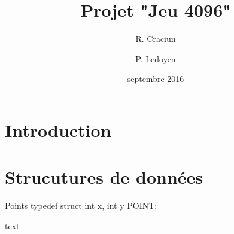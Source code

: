 \documentclass[12pt,a4paper]{article}
\author{R. Craciun \and P. Ledoyen}
\title{Projet "Jeu 4096"}
\date{septembre 2016}
\begin{document}
\maketitle

\section{Introduction}


\section{Strucutures de données}

\begin{codeC}{Points}
typedef struct
{
	int x,
	int y
}POINT;
\end{codeC}

text
\end{document}
